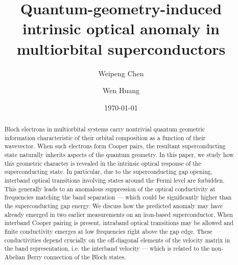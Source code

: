 \documentclass[prl,floatfix,twocolumn,showpacs,amsmath,superscriptaddress]{revtex4-2}
\begin{document}
\title{Quantum-geometry-induced intrinsic optical anomaly in multiorbital superconductors}

\author{Weipeng Chen}
\address{Shenzhen Institute for Quantum Science and Engineering, Southern University of Science and Technology, Shenzhen 518055, Guangdong, China}
\address{International Quantum Academy (SIQA), and Shenzhen Branch, Hefei National Laboratory, Futian District 518048, Shenzhen, China}
\address{Guangdong Provincial Key Laboratory of Quantum Science and Engineering, Southern University of Science
	and Technology, Shenzhen 518055, Guangdong, China}
\author{Wen Huang}
\address{Shenzhen Institute for Quantum Science and Engineering, Southern University of Science and Technology, Shenzhen 518055, Guangdong, China}
\address{International Quantum Academy (SIQA), and Shenzhen Branch, Hefei National Laboratory, Futian District 518048, Shenzhen, China}
\address{Guangdong Provincial Key Laboratory of Quantum Science and Engineering, Southern University of Science
	and Technology, Shenzhen 518055, Guangdong, China}
\date{\today}

\begin{abstract}
	Bloch electrons in multiorbital systems carry nontrivial quantum geometric information characteristic of their orbital composition as a function of their wavevector. When such electrons form Cooper pairs, the resultant superconducting state naturally inherits aspects of the quantum geometry. In this paper, we study how this geometric character is revealed in the intrinsic optical response of the superconducting state. In particular, due to the superconducting gap opening, interband optical transitions involving states around the Fermi level are forbidden. This generally leads to an anomalous suppression of the optical conductivity at frequencies matching the band separation --- which could be significantly higher than the superconducting gap energy. We discuss how the predicted anomaly may have already emerged in two earlier measurements on an iron-based superconductor. When interband Cooper pairing is present, intraband optical transitions may be allowed and finite conductivity emerges at low frequencies right above the gap edge. These conductivities depend crucially on the off-diagonal elements of the velocity matrix in the band representation, i.e. the interband velocity --- which is related to the non-Abelian Berry connection of the Bloch states. 
\end{abstract}
\maketitle
\end{document}
